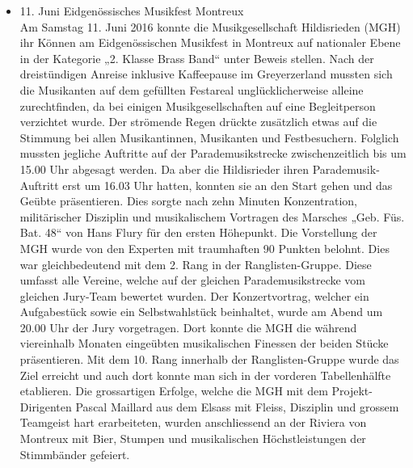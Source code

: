 \begin{history}
\begin{itemize}
            \item 11. Juni Eidgenössisches Musikfest Montreux\\
                  Am Samstag 11. Juni 2016 konnte die Musikgesellschaft
                  Hildisrieden (MGH) ihr Können am Eidgenössischen Musikfest in
                  Montreux auf nationaler Ebene in der Kategorie „2. Klasse
                  Brass Band“ unter Beweis stellen. Nach der dreistündigen
                  Anreise inklusive Kaffeepause im Greyerzerland mussten sich
                  die Musikanten auf dem gefüllten Festareal unglücklicherweise
                  alleine zurechtfinden, da bei einigen Musikgesellschaften auf
                  eine Begleitperson verzichtet wurde. Der strömende Regen
                  drückte zusätzlich etwas auf die Stimmung bei allen
                  Musikantinnen, Musikanten und Festbesuchern. Folglich mussten
                  jegliche Auftritte auf der Parademusikstrecke zwischenzeitlich
                  bis um 15.00 Uhr abgesagt werden. Da aber die Hildisrieder
                  ihren Parademusik-Auftritt erst um 16.03 Uhr hatten, konnten
                  sie an den Start gehen und das Geübte präsentieren. Dies
                  sorgte nach zehn Minuten Konzentration, militärischer
                  Disziplin und musikalischem Vortragen des Marsches „Geb. Füs.
                  Bat. 48“ von Hans Flury für den ersten Höhepunkt. Die
                  Vorstellung der MGH wurde von den Experten mit traumhaften 90
                  Punkten belohnt. Dies war gleichbedeutend mit dem 2. Rang in
                  der Ranglisten-Gruppe. Diese umfasst alle Vereine, welche auf
                  der gleichen Parademusikstrecke vom gleichen Jury-Team
                  bewertet wurden. Der Konzertvortrag, welcher ein Aufgabestück
                  sowie ein Selbstwahlstück beinhaltet, wurde am Abend um 20.00
                  Uhr der Jury vorgetragen. Dort konnte die MGH die während
                  viereinhalb Monaten eingeübten musikalischen Finessen der
                  beiden Stücke präsentieren. Mit dem 10. Rang innerhalb der
                  Ranglisten-Gruppe wurde das Ziel erreicht und auch dort konnte
                  man sich in der vorderen Tabellenhälfte etablieren. Die
                  grossartigen Erfolge, welche die MGH mit dem
                  Projekt-Dirigenten Pascal Maillard aus dem Elsass mit Fleiss,
                  Disziplin und grossem Teamgeist hart erarbeiteten, wurden
                  anschliessend an der Riviera von Montreux mit Bier, Stumpen
                  und musikalischen Höchstleistungen der Stimmbänder gefeiert.

\end{itemize}
\end{history}
